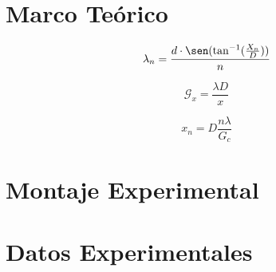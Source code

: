 \documentclass[twocolumn, 12pt]{article}
\begin{document}
\section{Marco Teórico}

 {\Large
  \begin{equation}
        \lambda_{n} = \frac{d \cdot \sen ( \tan^{-1} (\frac{X_{n}}{D}))}{n}
        \label{eq:lambda-n}
  \end{equation}
 }

 {\Large
  \begin{equation}
        \mathcal{G}_x = \frac{\lambda D}{x}
        \label{eq:grosor-cabello}
  \end{equation}
 }

 {\Large
  \begin{equation}
        x_{n} = D \frac{n \lambda}{G_{c}}
        \label{eq:x_n}
  \end{equation}
 }

\section{Montaje Experimental}

\section{Datos Experimentales}
\end{document}
